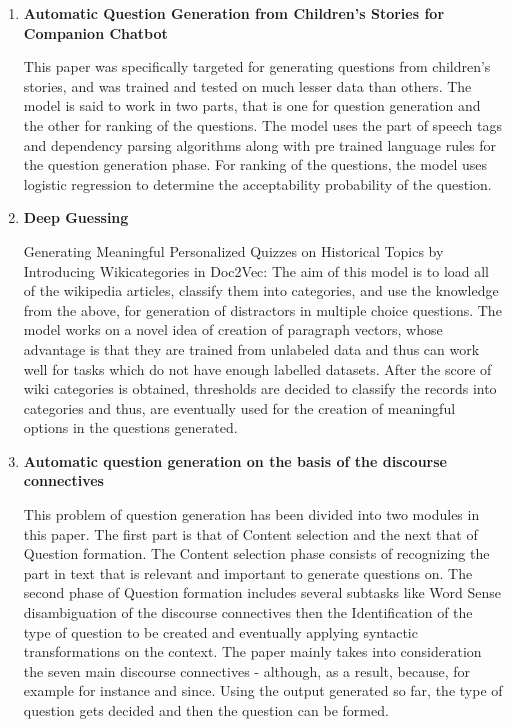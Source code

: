 \begin{enumerate}[align=left]
\item \textbf{Automatic Question Generation from Children’s Stories for
	Companion Chatbot}
		
This paper was specifically targeted for generating questions from children’s
		stories, and was trained and tested on much lesser data than
		others. The model is said to work in two parts, that is one for
		question generation and the other for ranking of the questions.
		The model uses the part of speech tags and dependency parsing
		algorithms along with pre trained language rules for the
		question generation phase. For ranking of the questions, the
		model uses logistic regression to determine the acceptability
		probability of the question. 

\item \textbf{Deep Guessing}
	
	Generating Meaningful Personalized Quizzes on Historical Topics by
		Introducing Wikicategories in Doc2Vec: The aim of this model is
		to load all of the wikipedia articles, classify them into
		categories, and use the knowledge from the above, for generation
		of distractors in multiple choice questions. The model works on
		a novel idea of creation of paragraph vectors, whose advantage
		is that they are trained from unlabeled data and thus can work
		well for tasks which do not have enough labelled datasets. After
		the score of wiki categories is obtained, thresholds are decided
		to classify the records into categories and thus, are eventually
		used for the creation of meaningful options in the questions
		generated. 

\item \textbf{Automatic question generation on the basis of the discourse
	connectives}
	
	This problem of question generation has been divided into two modules in
	this paper.  The first part is that of Content selection and the next
	that of Question formation. The Content selection phase consists of
	recognizing the part in text that is relevant and important to generate
	questions on. The second phase of Question formation includes several
	subtasks like Word Sense disambiguation of the discourse connectives
	then the Identification of the type of question to be created and
	eventually applying syntactic transformations on the context. The paper
	mainly takes into consideration the seven main discourse connectives -
	although, as a result, because, for example for instance and since.
	Using the output generated so far, the type of question gets decided and
	then the question can be formed. 


\end{enumerate}
